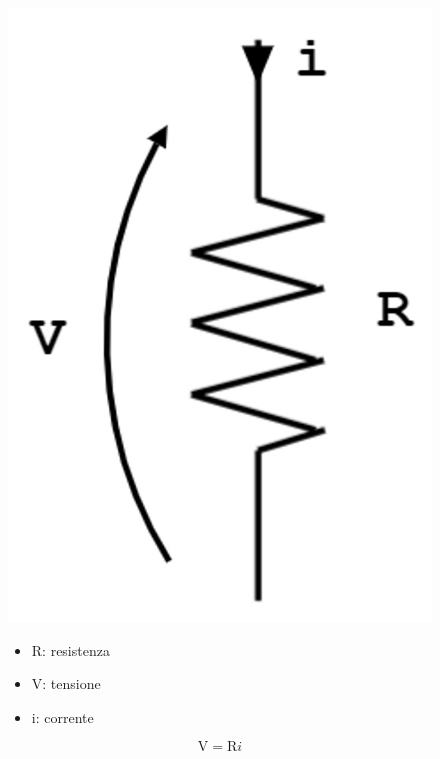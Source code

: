 	\begin{figure}[H]
		\begin{minipage}{.3\textwidth}
			\centering
			\includegraphics[width=.4\linewidth]{"Images/resistore.png"}
		\end{minipage}%
		\begin{minipage}{.3\textwidth}
			\begin{itemize}
				\item R: resistenza
				\item V: tensione
				\item i: corrente
			\end{itemize}
		\end{minipage}
		\begin{minipage}{.3\textwidth}
			\centering
			\begin{equation*}
				\boxed{\text{V} = \text{R}i}
			\end{equation*}
		\end{minipage}
	\end{figure}
	
